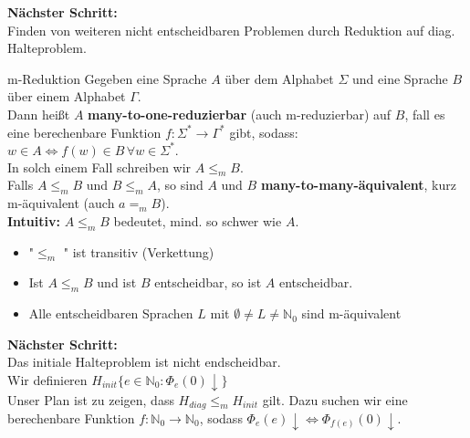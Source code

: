 \textbf{Nächster Schritt:} \\
Finden von weiteren nicht entscheidbaren Problemen durch Reduktion auf diag. Halteproblem.

\begin{defn}{m-Reduktion}
    Gegeben eine Sprache $A$ über dem Alphabet $\Sigma$ und eine Sprache $B$ über einem Alphabet $\Gamma$. \\
    Dann heißt $A$ \textbf{many-to-one-reduzierbar} (auch m-reduzierbar) auf $B$, fall es eine berechenbare Funktion
    $f : \Sigma^* \rightarrow \Gamma^*$ gibt, sodass: \\
    $w \in A \Leftrightarrow f(w) \in B \, \forall w \in \Sigma^*. $\\
    In solch einem Fall schreiben wir $A \leq_m B$. \\

    Falls $A \leq_m B$ und $B \leq_m A$, so sind $A$ und $B$ \textbf{many-to-many-äquivalent}, kurz m-äquivalent (auch $a =_m B$). \\

    \textbf{Intuitiv:} $A \leq_m B$ bedeutet, mind. so schwer wie $A$.
\end{defn}

\begin{bem}
    \begin{itemize}
        \item "$\leq_m$ "{} ist transitiv (Verkettung)
        \item Ist $A \leq_m B$ und ist $B$ entscheidbar, so ist $A$ entscheidbar.
        \item Alle entscheidbaren Sprachen $L$ mit $\emptyset \neq L \neq \mathbb{N}_0$ sind m-äquivalent
    \end{itemize}
\end{bem}

\textbf{Nächster Schritt:} \\
Das initiale Halteproblem ist nicht endscheidbar. \\

Wir definieren $H_{init}\{e \in \mathbb{N}_0 : \Phi_e(0)\downarrow\}$ \\

Unser Plan ist zu zeigen, dass $H_{diag} \leq_m H_{init}$ gilt.
Dazu suchen wir eine berechenbare Funktion $f: \mathbb{N}_0 \rightarrow \mathbb{N}_0$, sodass $\Phi_e(e)\downarrow \Leftrightarrow \Phi_{f(e)}(0)\downarrow$.

